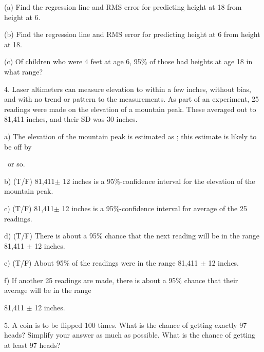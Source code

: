 \documentclass[10pt]{article}
\begin{document}
(a) Find the regression line and RMS error for predicting height at 18 from height at 6.
\vspace{1in}

(b) Find the regression line and RMS error for predicting height at 6 from height at 18.
\vspace{1in}

(c) Of children who were 4 feet at age 6, 95\% of those had heights
at age 18 in what range?

\vfill
\eject
\newcommand{\BL}{\underbar{\hspace{.5in}}}



4.
Laser altimeters can measure elevation to within a few inches, without bias,
and with no trend or pattern to the measurements.
As part of an experiment, 25 readings were made on the elevation of a mountain peak.
These averaged out to 81,411 inches, and their SD was 30 inches. 

\hspace{20pt} a) The elevation of the mountain peak is estimated 
as \BL; this estimate is likely to be off by\vspace{-4pt}

\hspace{20pt}\hphantom{f) } \BL\ or so.
\bigskip
\bigskip

\hspace{20pt} b) (T/F) 81,411$\pm$ 12 inches is a 95\%-confidence interval for the elevation
of the mountain peak. 
\bigskip
\bigskip

\hspace{20pt} c) (T/F) 81,411$\pm$ 12 inches is a 95\%-confidence interval for 
average of the 25 readings.

\hspace{20pt} d) (T/F) There is about a 95\% chance that the next reading will be in 
the range 81,411 $\pm$ 12 inches.

\hspace{20pt} e) (T/F) About 95\% of the readings were in the range 81,411 $\pm$ 12 inches.

\hspace{20pt} f) If another 25 readings are made, there is about a 95\% chance that their
average will be in the range\vspace{-4pt}

\hspace{20pt}\hphantom{f) } 81,411 $\pm$ 12 inches.
\bigskip\bigskip

5. A coin is to be flipped 100 times. What is the chance of 
getting exactly 97 heads?  Simplify your answer as much as possible.
What is the chance of getting at least 97 heads?
\vspace{1.5in}
\end{document}
